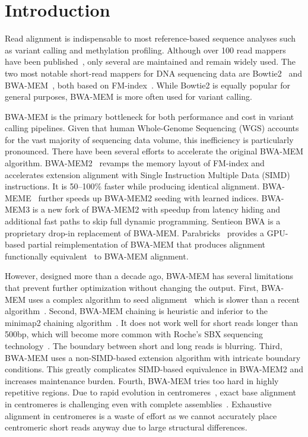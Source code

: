 \documentclass[webpdf,contemporary,large,namedate]{oup-authoring-template}%
\begin{document}
\section{Introduction}

Read alignment is indispensable to most reference-based sequence analyses such as variant calling and methylation profiling.
Although over 100 read mappers have been published~\citep{Alser:2021aa,DBLP:journals/csur/ProusalisGKNKAPSG26},
only several are maintained and remain widely used.
The two most notable short-read mappers for DNA sequencing data are Bowtie2~\citep{Langmead:2012fk} and BWA-MEM~\citep{Li:2013aa}, both based on FM-index~\citep{DBLP:conf/focs/FerraginaM00}.
While Bowtie2 is equally popular for general purposes, BWA-MEM is more often used for variant calling.

BWA-MEM is the primary bottleneck for both performance and cost in variant calling pipelines.
Given that human Whole-Genome Sequencing (WGS) accounts for the vast majority of sequencing data volume, this inefficiency is particularly pronounced.
There have been several efforts to accelerate the original BWA-MEM algorithm.
BWA-MEM2~\citep{DBLP:conf/ipps/VasimuddinMLA19} revamps the memory layout of FM-index
and accelerates extension alignment with Single Instruction Multiple Data (SIMD) instructions.
It is 50--100\% faster while producing identical alignment.
BWA-MEME~\citep{Jung:2022aa} further speeds up BWA-MEM2 seeding with learned indices.
BWA-MEM3 is a new fork of BWA-MEM2 with speedup from latency hiding and additional fast paths to skip full dynamic programming.
Sentieon BWA is a proprietary drop-in replacement of BWA-MEM.
Parabricks~\citep{OConnell:2023aa,Zhu2025.07.23.666378} provides a GPU-based partial reimplementation of BWA-MEM
that produces alignment functionally equivalent~\citep{Regier:2018aa} to BWA-MEM alignment.

However, designed more than a decade ago, BWA-MEM has several limitations that prevent further optimization without changing the output.
First, BWA-MEM uses a complex algorithm to seed alignment~\citep{Li:2012fk} which is slower than a recent algorithm~\citep{DBLP:conf/dlt/Gagie24,Li:2024ac}.
Second, BWA-MEM chaining is heuristic and inferior to the minimap2 chaining algorithm~\citep{Li:2018ab}.
It does not work well for short reads longer than 500bp, which will become more common with Roche's SBX sequencing technology~\citep{Kokoris2025.02.19.639056}.
The boundary between short and long reads is blurring.
Third, BWA-MEM uses a non-SIMD-based extension algorithm with intricate boundary conditions.
This greatly complicates SIMD-based equivalence in BWA-MEM2 and increases maintenance burden.
Fourth, BWA-MEM tries too hard in highly repetitive regions.
Due to rapid evolution in centromeres~\citep{Gao2025.12.09.693231}, 
exact base alignment in centromeres is challenging even with complete assemblies~\citep{Bzikadze:2022aa}.
Exhaustive alignment in centromeres is a waste of effort
as we cannot accurately place centromeric short reads anyway due to large structural differences.
\end{document}
